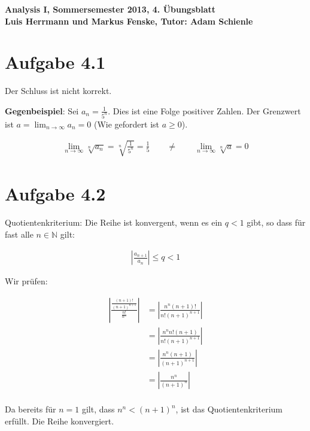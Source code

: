 \documentclass[a4paper,german,12pt,smallheadings]{scrartcl}
\begin{document}
\begin{center}
\bfseries %
\sffamily %
\vspace{-40pt}
Analysis I, Sommersemester 2013, 4. Übungsblatt \\
Luis Herrmann und Markus Fenske, Tutor: Adam Schienle
\vspace{-10pt}
\end{center}

\section*{Aufgabe 4.1}
Der Schluss ist nicht korrekt.

\textbf{Gegenbeispiel}: Sei $a_n = \frac{1}{5^n}$. Dies ist eine Folge positiver Zahlen.
Der Grenzwert ist $ a = \lim_{n \to \infty} a_n = 0$ (Wie gefordert ist $a \ge
0$).

\begin{align*}
  \lim_{n \to \infty} \sqrt[n]{a_n} = \sqrt[n]{\frac{1}{5^n}} = \frac{1}{5}\qquad \neq\qquad \lim_{n \to \infty} \sqrt[n]{a} = 0
\end{align*}

\section*{Aufgabe 4.2}
Quotientenkriterium: Die Reihe ist konvergent, wenn es ein $q < 1$ gibt, so
dass für fast alle $n \in \mathbb{N}$ gilt:

\begin{align*}
  \left| \frac{a_{n+1}}{a_n} \right| \le q < 1
\end{align*}

Wir prüfen:

\begin{align*}
  \left| \frac{\frac{(n+1)!}{(n+1)^{n+1}}}{\frac{n!}{n^n}} \right| &= \left| \frac{n^n(n+1)!}{n!(n+1)^{n+1}} \right| \\ 
  &= \left| \frac{n^n n! (n+1)}{n!(n+1)^{n+1}} \right| \\
  &= \left| \frac{n^n (n+1)}{(n+1)^{n+1}} \right| \\
  &= \left| \frac{n^n}{(n+1)^{n}} \right| \\
\end{align*}

Da bereits für $n=1$ gilt, dass $n^n < (n+1)^n$, ist das Quotientenkriterium
erfüllt. Die Reihe konvergiert.
\end{document}
